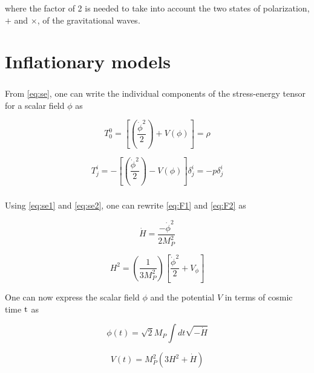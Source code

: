 \documentclass[12pt,a4paper,oneside]{book}
\begin{document}
\noindent where the factor of 2 is needed to take into account the two states of polarization, $+$ and $\times$, of the gravitational waves.


\chapter{Inflationary models}


\paragraph*{} From \ref{eq:se}, one can write the individual components of the stress-energy tensor for a scalar field $\phi$ as

\begin{equation}\label{eq:se1}
T^{0}_{0} = \left[\left(\frac{\dot{\phi}^2}{2}\right) +V(\phi)\right] = \rho 
\end{equation}

\begin{equation}\label{eq:se2}
T^{i}_{j} = -\left[\left(\frac{\dot{\phi}^2}{2}\right) - V(\phi)\right]\delta^{i}_{j} = -p\delta^i_j
\end{equation}

\paragraph*{} Using \ref{eq:se1} and \ref{eq:se2}, one can rewrite \ref{eq:F1} and \ref{eq:F2} as

\begin{equation}
 \dot{H} = \frac{-\dot{\phi}^2}{2M_P^2}
\end{equation}

\begin{equation}
H^2 = \left(\frac{1}{3M_P^2}\right)\left[\frac{\dot{\phi}^2}{2} + V_{\phi}\right]
\end{equation}

\noindent One can now express the scalar field $\phi$ and the potential $V$ in terms of cosmic time ${\rm t}$ as

\begin{equation}
\phi(t)= \sqrt{2}M_P \int dt \sqrt{-\dot{H}}
\end{equation}

\begin{equation}
V(t) = M_P^2\left(3H^2 + \dot{H}\right)
\end{equation}
\end{document}
